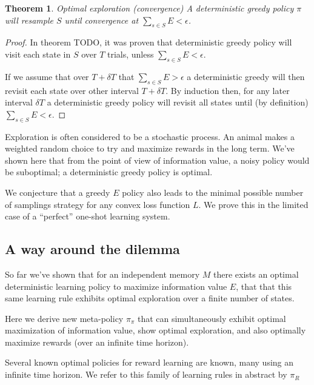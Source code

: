 \documentclass[9pt,twocolumn,twoside]{pnas-new}
\newtheorem{theorem}{Theorem}[section]
\begin{document}
\begin{theorem}{Optimal exploration (convergence)}
    A deterministic greedy policy $\pi$ will resample $S$ until convergence at $\sum_{s \in S} E < \epsilon$.
\end{theorem}
\begin{proof}
    In theorem TODO, it was proven that deterministic greedy policy will visit each state in $S$ over $T$ trials, unless $\sum_{s \in S} E < \epsilon$. 
    
    If we assume that over $T + \delta T$ that $\sum_{s \in S} E > \epsilon$ a deterministic greedy will then revisit each state over other interval $T + \delta T$. By induction then, for any later interval $\delta T$ a deterministic greedy policy will revisit all states until (by definition) $\sum_{s \in S} E < \epsilon$.
\end{proof}

Exploration is often considered to be a stochastic process. An animal makes a weighted random choice to try and maximize rewards in the long term. We've shown here that from the point of view of information value, a noisy policy would be suboptimal; a deterministic greedy policy is optimal.

We conjecture that a greedy $E$ policy also leads to the minimal possible number of samplings strategy for any convex loss function $L$. We prove this in the limited case of a ``perfect'' one-shot learning system.


\subsection*{A way around the dilemma} \label{sec:Obj1b}
So far we've shown that for an independent memory $M$ there exists an optimal deterministic learning policy to maximize information value $E$, that that this same learning rule exhibits optimal exploration over a finite number of states. 

Here we derive new meta-policy $\pi_{\pi}$ that can simultaneously exhibit optimal maximization of information value, show optimal exploration, and also optimally maximize rewards (over an infinite time horizon).

Several known optimal policies for reward learning are known, many using an infinite time horizon. We refer to this family of learning rules in abstract by $\pi_R$
\end{document}
